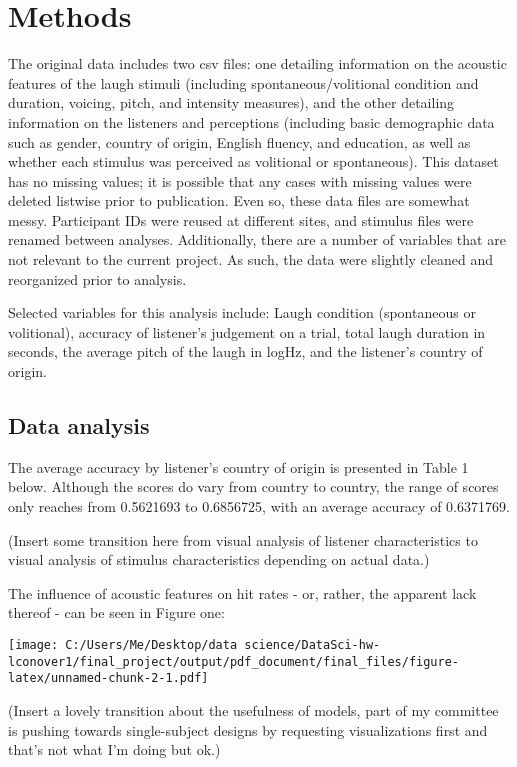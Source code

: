 \documentclass[
]{article}
\begin{document}
\hypertarget{methods}{%
\section{Methods}\label{methods}}

The original data includes two csv files: one detailing information on
the acoustic features of the laugh stimuli (including
spontaneous/volitional condition and duration, voicing, pitch, and
intensity measures), and the other detailing information on the
listeners and perceptions (including basic demographic data such as
gender, country of origin, English fluency, and education, as well as
whether each stimulus was perceived as volitional or spontaneous). This
dataset has no missing values; it is possible that any cases with
missing values were deleted listwise prior to publication. Even so,
these data files are somewhat messy. Participant IDs were reused at
different sites, and stimulus files were renamed between analyses.
Additionally, there are a number of variables that are not relevant to
the current project. As such, the data were slightly cleaned and
reorganized prior to analysis.

Selected variables for this analysis include: Laugh condition
(spontaneous or volitional), accuracy of listener's judgement on a
trial, total laugh duration in seconds, the average pitch of the laugh
in logHz, and the listener's country of origin.

\hypertarget{data-analysis}{%
\subsection{Data analysis}\label{data-analysis}}

The average accuracy by listener's country of origin is presented in
Table 1 below. Although the scores do vary from country to country, the
range of scores only reaches from 0.5621693 to 0.6856725, with an
average accuracy of 0.6371769.

(Insert some transition here from visual analysis of listener
characteristics to visual analysis of stimulus characteristics depending
on actual data.)

The influence of acoustic features on hit rates - or, rather, the
apparent lack thereof - can be seen in Figure one:

\texttt{[image: C:/Users/Me/Desktop/data science/DataSci-hw-lconover1/final\_project/output/pdf\_document/final\_files/figure-latex/unnamed-chunk-2-1.pdf]}

(Insert a lovely transition about the usefulness of models, part of my
committee is pushing towards single-subject designs by requesting
visualizations first and that's not what I'm doing but ok.)
\end{document}
